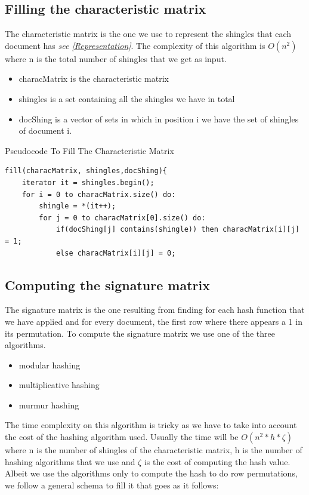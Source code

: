 \documentclass[12pt]{article}
\begin{document}
\subsection{Filling the characteristic matrix}
The characteristic matrix is the one we use to represent the shingles that each document has \textit{see \autoref{Representation}}. The complexity of this algorithm is $O(n^2)$ where n is the total number of shingles that we get as input.
\begin{itemize}
\item characMatrix is the characteristic matrix
\item shingles is a set containing all the shingles we have in total
\item docShing is a vector of sets in which in position i we have the set of shingles of document i. 
\end{itemize}
 \begin{center}
\begin{large}
Pseudocode To Fill The Characteristic Matrix
\end{large}
\end{center}
 \begin{lstlisting}
fill(characMatrix, shingles,docShing){
    iterator it = shingles.begin();
    for i = 0 to characMatrix.size() do:
        shingle = *(it++);
        for j = 0 to characMatrix[0].size() do:
            if(docShing[j] contains(shingle)) then characMatrix[i][j] = 1;
            else characMatrix[i][j] = 0;
\end{lstlisting}
\medskip

\subsection{Computing the signature matrix}
The signature matrix is the one resulting from finding for each hash function that we have applied and for every document, the first row where there appears a 1 in its permutation.
To compute the signature matrix we use one of the three algorithms.
\begin{itemize}
\item modular hashing
\item multiplicative hashing
\item murmur hashing 
\end{itemize}
The time complexity on this algorithm is tricky as we have to take into account the cost of the hashing algorithm used. Usually the time will be $O(n^2 * h * \zeta)$ where n is the number of shingles of the characteristic matrix, h is the number of hashing algorithms that we use and $\zeta$ is the cost of computing the hash value.
Albeit we use the algorithms only to compute the hash to do row permutations, we follow a general schema to fill it that goes as it follows:
\end{document}
